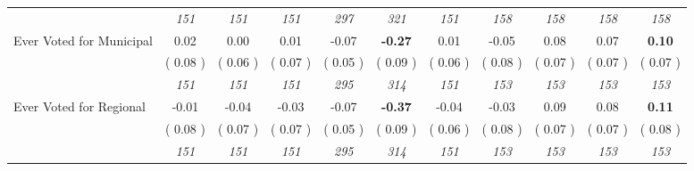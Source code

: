 \begin{tabular}{l c c c c c c c c c c}
& \textit{ 151 } & \textit{ 151 } & \textit{ 151 } & \textit{ 297 } & \textit{ 321 } & \textit{ 151 } & \textit{ 158 } & \textit{ 158 } & \textit{ 158 } & \textit{ 158 } \\
Ever Voted for Municipal &      0.02 &      0.00 &      0.01 &     -0.07 & \textbf{     -0.27 } &      0.01 &     -0.05 &      0.08 &      0.07 & \textbf{     0.10} \\
& (     0.08 ) & (     0.06 ) & (     0.07 ) & (     0.05 ) & (     0.09 ) & (     0.06 ) & (     0.08 ) & (     0.07 ) & (     0.07 ) & (     0.07 ) \\
& \textit{ 151 } & \textit{ 151 } & \textit{ 151 } & \textit{ 295 } & \textit{ 314 } & \textit{ 151 } & \textit{ 153 } & \textit{ 153 } & \textit{ 153 } & \textit{ 153 } \\
Ever Voted for Regional &     -0.01 &     -0.04 &     -0.03 &     -0.07 & \textbf{     -0.37 } &     -0.04 &     -0.03 &      0.09 &      0.08 & \textbf{     0.11} \\
& (     0.08 ) & (     0.07 ) & (     0.07 ) & (     0.05 ) & (     0.09 ) & (     0.06 ) & (     0.08 ) & (     0.07 ) & (     0.07 ) & (     0.08 ) \\
& \textit{ 151 } & \textit{ 151 } & \textit{ 151 } & \textit{ 295 } & \textit{ 314 } & \textit{ 151 } & \textit{ 153 } & \textit{ 153 } & \textit{ 153 } & \textit{ 153 } \\
\bottomrule
\end{tabular}

